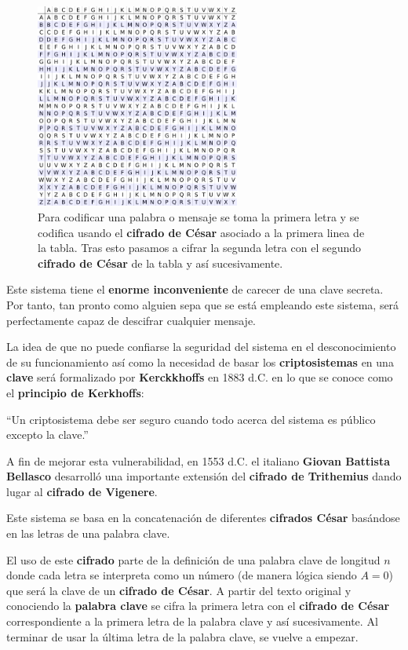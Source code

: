 \documentclass[nochap]{apuntesURJC}
\begin{document}
\begin{figure}[hbtp]
\centering
\includegraphics[width=0.6\textwidth]{img/tabula_recta.png}
\caption{Para codificar una palabra o mensaje se toma la primera letra y se codifica usando el \textbf{cifrado de César} asociado a la primera linea de la tabla. Tras esto pasamos a cifrar la segunda letra con el segundo \textbf{cifrado de César} de la tabla y así sucesivamente.}
\label{fig:tabula_recta}
\end{figure}

Este sistema tiene el \textbf{enorme inconveniente} de carecer de una clave secreta. Por tanto, tan pronto como alguien sepa que se está empleando este sistema, será perfectamente capaz de descifrar cualquier mensaje.

La idea de que no puede confiarse la seguridad del sistema en el desconocimiento de su funcionamiento así como la necesidad de basar los \textbf{criptosistemas} en una \textbf{clave} será formalizado por \textbf{Kerckkhoffs} en 1883 d.C. en lo que se conoce como el \textbf{principio de Kerkhoffs}:
\begin{center}
``Un criptosistema debe ser seguro cuando todo acerca del sistema es público excepto la clave.''
\end{center}

A fin de mejorar esta vulnerabilidad, en 1553 d.C. el italiano \textbf{Giovan Battista Bellasco} desarrolló una importante extensión del \textbf{cifrado de Trithemius} dando lugar al \textbf{cifrado de Vigenere}.

Este sistema se basa en la concatenación de diferentes \textbf{cifrados César} basándose en las letras de una palabra clave.

El uso de este \textbf{cifrado} parte de la definición de una palabra clave de longitud $n$ donde cada letra se interpreta como un número (de manera lógica siendo $A=0$) que será la clave de un \textbf{cifrado de César}. A partir del texto original y conociendo la \textbf{palabra clave} se cifra la primera letra con el \textbf{cifrado de César} correspondiente a la primera letra de la palabra clave y así sucesivamente. Al terminar de usar la última letra de la palabra clave, se vuelve a empezar.
\end{document}
